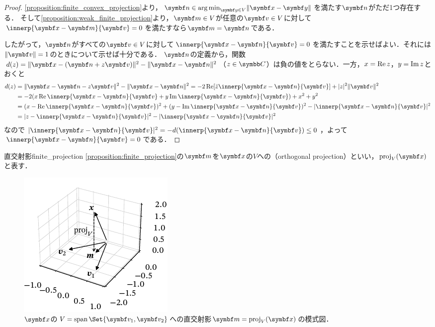 \documentclass[../../main]{subfiles}
\begin{document}
\begin{proof}
  \cref{proposition:finite_convex_projection}より，\(\vect{n}\in\argmin_{\vect{y}\in V}\vnorm{\vect{x}-\vect{y}}\)を満たす\(\vect{n}\)がただ1つ存在する．
  そして\cref{proposition:weak_finite_projection}より，\(\vect{m}\in V\)が任意の\(\vect{v}\in V\)に対して\(\innerp{\vect{x}-\vect{m}}{\vect{v}}=0\)を満たすなら\(\vect{m}=\vect{n}\)である．

  したがって，\(\vect{n}\)がすべての\(\vect{v}\in V\)に対して\(\innerp{\vect{x}-\vect{n}}{\vect{v}}=0\)を満たすことを示せばよい．それには\(\vnorm{\vect{v}}=1\)のときについて示せば十分である．
  \(\vect{n}\)の定義から，関数\(d(z)=\vnorm{\vect{x}-(\vect{n}+z\vect{v})}^2-\vnorm{\vect{x}-\vect{n}}^2\)（\(z\in\numset{C}\)）は負の値をとらない．一方，\(x=\operatorname{Re} z\)，\(y=\operatorname{Im} z\)とおくと
  \begin{align*}
    d(z) &= \vnorm{\vect{x}-\vect{n}-z\vect{v}}^2-\vnorm{\vect{x}-\vect{n}}^2
    = -2\rpart[\conj{z}\innerp{\vect{x}-\vect{n}}{\vect{v}}]+\abs{z}^2\vnorm{\vect{v}}^2 \\
    &= -2(x\rpart\innerp{\vect{x}-\vect{n}}{\vect{v}}+y\ipart\innerp{\vect{x}-\vect{n}}{\vect{v}})+x^2+y^2 \\
    &= (x-\rpart\innerp{\vect{x}-\vect{n}}{\vect{v}})^2+(y-\ipart\innerp{\vect{x}-\vect{n}}{\vect{v}})^2-\abs{\innerp{\vect{x}-\vect{n}}{\vect{v}}}^2 \\
    &= \abs{z-\innerp{\vect{x}-\vect{n}}{\vect{v}}}^2-\abs{\innerp{\vect{x}-\vect{n}}{\vect{v}}}^2
  \end{align*}
  なので\(\abs{\innerp{\vect{x}-\vect{n}}{\vect{v}}}^2=-d(\innerp{\vect{x}-\vect{n}}{\vect{v}})\leq 0\)，よって\(\innerp{\vect{x}-\vect{n}}{\vect{v}}=0\)である．
\end{proof}

\begin{definition}{直交射影}{finite_projection}
  \cref{proposition:finite_projection}の\(\vect{m}\)を\(\vect{x}\)の\(V\)への（orthogonal projection）といい，\(\proj_V(\vect{x})\)と表す．
\end{definition}

\begin{figure}[htbp]
  \centering
  \includegraphics{figure/proj3d.pdf}
  \caption{\(\vect{x}\)の\(V=\spannedby\Set{\vect{v}_1,\vect{v}_2}\)への直交射影\(\vect{m}=\proj_V(\vect{x})\)の模式図．}
\end{figure}
\end{document}
